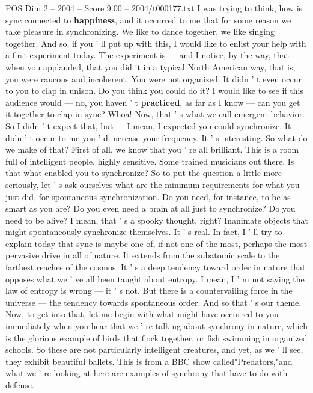\begin{textsample}{POS Dim 2 – 2004 – Score 9.00 – 2004/t000177.txt}  \label{ex:f2_pos_026}
I was trying to think, how is sync connected to \textbf{happiness}, and it occurred to me that for some reason we take pleasure in synchronizing.
We like to dance together, we like singing together.
And so, if you ' ll put up with this, I would like to enlist your help with a first experiment today.
The experiment is — and I notice, by the way, that when you applauded, that you did it in a typical North American way, that is, you were raucous and incoherent.
You were not organized.
It didn ' t even occur to you to clap in unison.
Do you think you could do it?
I would like to see if this audience would — no, you haven ' t \textbf{practiced}, as far as I know — can you get it together to clap in sync?
Whoa!
Now, that ' s what we call emergent behavior.
So I didn ' t expect that, but — I mean, I expected you could synchronize.
It didn ' t occur to me you ' d increase your frequency.
It ' s interesting.
So what do we make of that?
First of all, we know that you ' re all brilliant.
This is a room full of intelligent people, highly sensitive.
Some trained musicians out there.
Is that what enabled you to synchronize?
So to put the question a little more seriously, let ' s ask ourselves what are the minimum requirements for what you just did, for spontaneous synchronization.
Do you need, for instance, to be as smart as you are?
Do you even need a brain at all just to synchronize?
Do you need to be alive?
I mean, that ' s a spooky thought, right?
Inanimate objects that might spontaneously synchronize themselves.
It ' s real.
In fact, I ' ll try to explain today that sync is maybe one of, if not one of the most, perhaps the most pervasive drive in all of nature.
It extends from the subatomic scale to the farthest reaches of the cosmos.
It ' s a deep tendency toward order in nature that opposes what we ' ve all been taught about entropy.
I mean, I ' m not saying the law of entropy is wrong — it ' s not.
But there is a countervailing force in the universe — the tendency towards spontaneous order.
And so that ' s our theme.
Now, to get into that, let me begin with what might have occurred to you immediately when you hear that we ' re talking about synchrony in nature, which is the glorious example of birds that flock together, or fish swimming in organized schools.
So these are not particularly intelligent creatures, and yet, as we ' ll see, they exhibit beautiful ballets.
This is from a BBC show called"Predators,"and what we ' re looking at here are examples of synchrony that have to do with defense.

\end{textsample}
